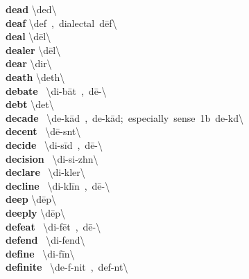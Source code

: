 \documentclass[10pt,a4paper]{article}
\begin{document}
\begin{multicols}{2}
\textbf{ dead }\quad \textbackslash \textprimstress ded\textbackslash \\
\textbf{ deaf }\quad \textbackslash \textprimstress def\ ,\ dialectal\ \textprimstress d\={e}f\textbackslash \\
\textbf{ deal }\quad \textbackslash \textprimstress d\={e}l\textbackslash \\
\textbf{ dealer }\quad \textbackslash \textprimstress d\={e}l\textbackslash \\
\textbf{ dear }\quad \textbackslash \textprimstress dir\textbackslash \\
\textbf{ death }\quad \textbackslash \textprimstress deth\textbackslash \\
\textbf{ debate }\quad \ \textbackslash di-\textprimstress b\={a}t\ ,\ d\={e}-\textbackslash \\
\textbf{ debt }\quad \textbackslash \textprimstress det\textbackslash \\
\textbf{ decade }\quad \ \textbackslash \textprimstress de-\textsecstress k\={a}d\ ,\ de-\textprimstress k\={a}d;\ especially\ sense\ 1b\ \textprimstress de-k\textschwa d\textbackslash \\
\textbf{ decent }\quad \ \textbackslash \textprimstress d\={e}-s\textsuperscript{\textreve}nt\textbackslash \\
\textbf{ decide }\quad \ \textbackslash di-\textprimstress s\={i}d\ ,\ d\={e}-\textbackslash \\
\textbf{ decision }\quad \ \textbackslash di-\textprimstress si-zh\textschwa n\textbackslash \\
\textbf{ declare }\quad \ \textbackslash di-\textprimstress kler\textbackslash \\
\textbf{ decline }\quad \ \textbackslash di-\textprimstress kl\={i}n\ ,\ d\={e}-\textbackslash \\
\textbf{ deep }\quad \textbackslash \textprimstress d\={e}p\textbackslash \\
\textbf{ deeply }\quad \textbackslash \textprimstress d\={e}p\textbackslash \\
\textbf{ defeat }\quad \ \textbackslash di-\textprimstress f\={e}t\ ,\ d\={e}-\textbackslash \\
\textbf{ defend }\quad \ \textbackslash di-\textprimstress fend\textbackslash \\
\textbf{ define }\quad \ \textbackslash di-\textprimstress f\={i}n\textbackslash \\
\textbf{ definite }\quad \ \textbackslash \textprimstress de-f\textschwa -nit\ ,\ \textprimstress def-n\textschwa t\textbackslash \\

\end{multicols}
\end{document}
